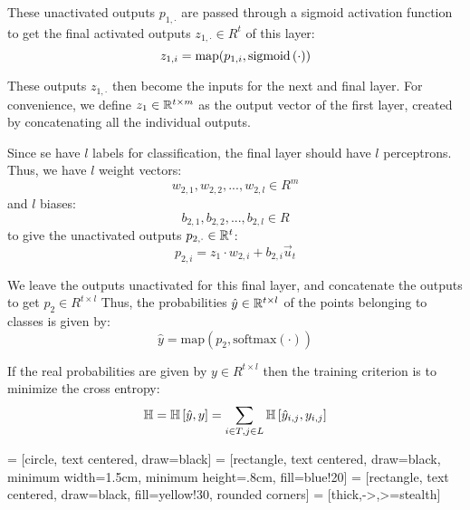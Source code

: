 \documentclass{article}
\begin{document}
  These unactivated outputs $p_{1, \cdot}$ are passed 
  through a sigmoid activation function
  to get the final activated outputs
  $z_{1, \cdot} \in R^{t}$ 
  of this layer:
  \[ z_{1, i} = \text{map}(p_{1, i}, \text{sigmoid}\left(\cdot\right))
  \]
  
  These outputs $z_{1, \cdot}$ then become 
  the inputs for the next and final layer.
  For convenience, we define
  $z_1 \in \mathbb{R}^{t \times m}$
  as the output vector of the first layer,
  created by concatenating all the individual outputs.
  
  Since se have $l$ labels for classification,
  the final layer should have $l$ perceptrons.
  Thus, we have $l$ weight vectors:
  \[ w_{2, 1}, w_{2, 2}, ..., w_{2, l} \in R^m \]
  and $l$ biases:
  \[ b_{2, 1}, b_{2, 2}, ..., b_{2, l} \in R \]
  to give the unactivated outputs $p_{2, \cdot} \in \mathbb{R}^t$:
  \[ p_{2, i} = z_1 \cdot w_{2, i} + b_{2, i} \overrightarrow u_{t} \]
  
  We leave the outputs unactivated for this final layer,
  and concatenate the outputs to get $p_2 \in {R^{t \times l}}$
  Thus, the probabilities $\hat y \in \mathbb{R}^{t \times l}$
  of the points belonging to classes is given by:
  \[ \hat y = \text{map}(p_2, \text{softmax}(\cdot)) \]
  
  If the real probabilities are given by $y \in R^{t \times l}$
  then the training criterion is to minimize the cross entropy:
  \[
    \mathbb{H}
    = \mathbb{H}\left[ \hat y, y \right]
    = \sum_{i \in T, j \in L} \mathbb{H}\left[ \hat y_{i, j}, y_{i, j} \right]
  \]
  
   = [circle, 
                    text centered,
                    draw=black]
   = [rectangle,
                            text centered,
                            draw=black,
                            minimum width=1.5cm,
                            minimum height=.8cm,
                            fill=blue!20]
   = [rectangle,
                        text centered,
                        draw=black,
                        fill=yellow!30,
                        rounded corners]
   = [thick,->,>=stealth]
                            
\end{document}
